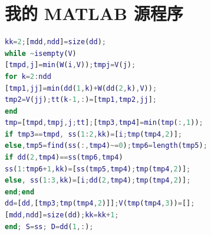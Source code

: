 \documentclass[bwprint]{gmcmthesis}
\begin{document}
\newpage
\appendix
\section{我的 MATLAB 源程序}
\begin{lstlisting}[language=Matlab]%设置不同语言即可。
kk=2;[mdd,ndd]=size(dd);
while ~isempty(V)
[tmpd,j]=min(W(i,V));tmpj=V(j);
for k=2:ndd
[tmp1,jj]=min(dd(1,k)+W(dd(2,k),V));
tmp2=V(jj);tt(k-1,:)=[tmp1,tmp2,jj];
end
tmp=[tmpd,tmpj,j;tt];[tmp3,tmp4]=min(tmp(:,1));
if tmp3==tmpd, ss(1:2,kk)=[i;tmp(tmp4,2)];
else,tmp5=find(ss(:,tmp4)~=0);tmp6=length(tmp5);
if dd(2,tmp4)==ss(tmp6,tmp4)
ss(1:tmp6+1,kk)=[ss(tmp5,tmp4);tmp(tmp4,2)];
else, ss(1:3,kk)=[i;dd(2,tmp4);tmp(tmp4,2)];
end;end
dd=[dd,[tmp3;tmp(tmp4,2)]];V(tmp(tmp4,3))=[];
[mdd,ndd]=size(dd);kk=kk+1;
end; S=ss; D=dd(1,:);


 \end{lstlisting}
\end{document}
